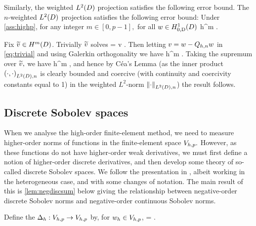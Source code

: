 
Similarly, the weighted $\LtD$ projection satisfies the following error bound.
The $n$-weighted $\LtD$ projection satisfies the following error bound:
\label{lem:wltdprojerr}
Under \cref{ass:highp}, for any integer $m \in [0,p-1],$ for all $w \in \HozDD$
\beq\label{eq:wltdprojerr}
 \leq {}  h^{m} .
\eeq
\ele

Fix $\vtilde \in \HmD$. Trivially $\widetilde{v}$ solves
\beq\label{eq:trivial}
 =  \tforall v \in \LtD.
\eeq
Then letting $v=w-Q_{h,n} w$ in \cref{eq:trivial} and using Galerkin orthogonality we have
\beqs%
 \leq {}\NLtDn{\vtilde-\Ih\vtilde}\leq {}  h^m \NHmDn{\vtilde}.
\eeqs%
Taking the supremum over $\widetilde{v},$ we have
\beqs
{} \leq {}  h^m ,
\eeqs
and hence by C\'ea's Lemma (as the inner product $\IPLtDn{\cdot}{\cdot}$ is clearly bounded and coercive (with continuity and coercivity constants equal to 1) in the weighted $L^2$-norm $\NLtDn{\cdot}$) the result follows.
\epf

\subsection{Discrete Sobolev spaces}\label{sec:discsob}
When we analyse the high-order finite-element method, we need to measure higher-order norms of functions in the finite-element space $V_{h,p}.$ However, as these functions do not have higher-order weak derivatives, we must first define a notion of higher-order discrete derivatives, and then develop some theory of so-called discrete Sobolev spaces. We follow the presentation in \cite{DuWu:15}, albeit working in the heterogeneous case, and with some changes of notation. The main result of this  is \cref{lem:negdiscsum} below giving the relationship between negative-order discrete Sobolev norms and negative-order continuous Sobolev norms.

Define the  $\Delta_{h}:V_{h,p}\rightarrow V_{h,p}$ by, for $w_{h} \in V_{h,p}$,
\beq\label{eq:discderdef}
\IPLtDn{\Deltah \wh}{\vh} =  \tforall \vh \in \Vhp.
\eeq
\ede

